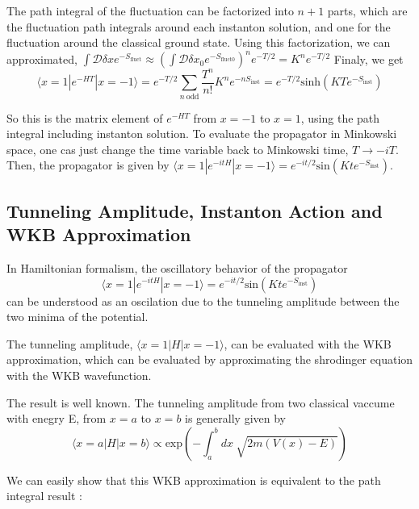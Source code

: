 \documentclass{article}
\begin{document}
The path integral of the fluctuation can be factorized into $n+1$ parts, which are the fluctuation path integrals around each instanton solution, and one for the fluctuation around the classical ground state.
Using this factorization, we can approximated, $\int \mathcal{D}\delta x e^{-S_{\text{fluct}}} \approx \left( \int \mathcal{D}\delta x_0 e^{-S_{\text{fluct}0}} \right)^n e^{-T/2}=K^n e^{-T/2}$
Finaly, we get
\begin{equation}
    \langle x = 1 | e^{-HT} | x = -1 \rangle = e^{-T/2} \sum_{n \ \text{odd}} \frac{T^n}{n!} K^n e^{-nS_{\text{inst}}}= e^{-T/2}  \text{sinh}(KT e^{-S_{\text{inst}}})
\end{equation}

So this is the matrix element of $e^{-HT}$ from $x = -1$ to $x = 1$, using the path integral including instanton solution. 
To evaluate the propagator in Minkowski space, one cas just change the time variable back to Minkowski time, $T \rightarrow -iT$.
Then, the propagator is given by $\langle x = 1 | e^{-itH} | x = -1 \rangle = e^{-it/2}  \text{sin}(Kt e^{-S_{\text{inst}}})$.

\subsection{Tunneling Amplitude, Instanton Action and WKB Approximation}

In Hamiltonian formalism, the oscillatory behavior of the propagator
\begin{equation}
    \langle x = 1 | e^{-itH} | x = -1 \rangle = e^{-it/2}  \text{sin}(Kt e^{-S_{\text{inst}}})
\end{equation}
can be understood as an oscilation due to the tunneling amplitude between the two minima of the potential.


The tunneling amplitude, $\langle x=1 | H | x=-1 \rangle $, can be evaluated with the WKB approximation, which can be evaluated by approximating the shrodinger equation with the WKB wavefunction.

The result is well known. The tunneling amplitude from two classical vaccume with enegry E, from $x = a$ to $x = b$ is generally given by
\begin{equation}
    \langle x = a | H | x = b \rangle \propto \text{exp}\left( -\int_a^b  dx \ \sqrt{2m(V(x)-E)} \right)
\end{equation}

We can easily show that this WKB approximation is equivalent to the path integral result :
    
\end{document}
